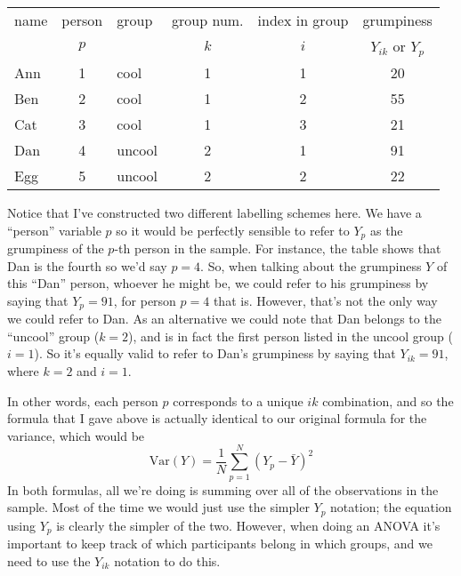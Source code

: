 \bigskip
\begin{center}
\begin{tabular}{lclccc} \hline 
name & person & group & group num. & index in group & grumpiness \\
& $p$ &          & $k$ & $i$ & $Y_{ik}$ or $Y_p$ \\ \hline
Ann & 1 & cool   &  1  &  1  & 20 \\
Ben & 2 & cool   &  1  &  2  & 55\\
Cat & 3 & cool   &  1  &  3  & 21\\
Dan & 4 & uncool &  2  &  1  & 91\\
Egg & 5 & uncool &  2  &  2  & 22\\
\end{tabular}
\end{center}
Notice that I've constructed two different labelling schemes here. We have a ``person'' variable $p$ so it would be perfectly sensible to refer to $Y_p$ as the grumpiness of the $p$-th person in the sample. For instance, the table shows that Dan is the fourth so we'd say $p = 4$. So, when talking about the grumpiness $Y$ of this ``Dan'' person, whoever he might be, we could refer to his grumpiness by saying that $Y_p = 91$, for person $p = 4$ that is.  However, that's not the only way we could refer to Dan. As an alternative we could note that Dan belongs to the ``uncool'' group ($k = 2$), and is in fact the first person listed in the uncool group ($i = 1$). So it's equally valid to refer to Dan's grumpiness by saying that $Y_{ik} = 91$, where $k = 2$ and $i = 1$. 

\vspace{0.5cm}
\begin{mdframed}[style=MyFrame,nobreak=true]
In other words, each person $p$ corresponds to a unique $ik$ combination, and so the formula that I gave above is actually identical to our original formula for the variance, which would be
$$
\mbox{Var}(Y) = \frac{1}{N} \sum_{p=1}^N  \left(Y_{p} - \bar{Y} \right)^2
$$
In both formulas, all we're doing is summing over all of the observations in the sample. Most of the time we would just use the simpler $Y_p$ notation; the equation using $Y_p$ is clearly the simpler of the two. However, when doing an ANOVA it's important to keep track of which participants belong in which groups, and we need to use the $Y_{ik}$ notation to do this. 
\end{mdframed}


